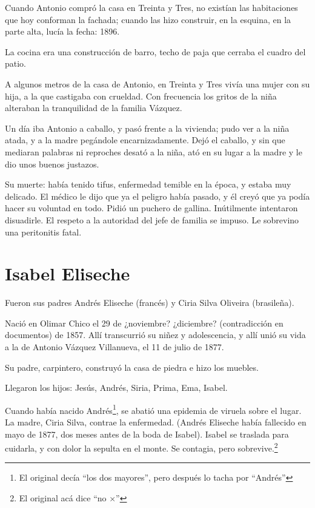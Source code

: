 \documentclass{article}
\begin{document}
\bigbreak{}

Cuando Antonio compró la casa en Treinta y Tres, no existían las habitaciones que hoy conforman la fachada; cuando las hizo construir, en la esquina, en la parte alta, lucía la fecha: 1896.

La cocina era una construcción de barro, techo de paja que cerraba el cuadro del patio.

\bigbreak{}

A algunos metros de la casa de Antonio, en Treinta y Tres vivía una mujer con su hija, a la que castigaba con crueldad. Con frecuencia los gritos de la niña alteraban la tranquilidad de la familia Vázquez.

Un día iba Antonio a caballo, y pasó frente a la vivienda; pudo ver a la niña atada, y a la madre pegándole encarnizadamente. Dejó el caballo, y sin que mediaran palabras ni reproches desató a la niña, ató en su lugar a la madre y le dio unos buenos justazos.

\bigbreak{}

Su muerte: había tenido tifus, enfermedad temible en la época, y estaba muy delicado. El médico le dijo que ya el peligro había pasado, y él creyó que ya podía hacer su voluntad en todo. Pidió un puchero de gallina. Inútilmente intentaron disuadirle. El respeto a la autoridad del jefe de familia se impuso. Le sobrevino una peritonitis fatal.

\section{Isabel Eliseche}

Fueron sus padres Andrés Eliseche (francés) y Ciria Silva Oliveira (brasileña).

Nació en Olimar Chico el 29 de ¿noviembre? ¿diciembre? (contradicción en documentos) de 1857. Allí transcurrió su niñez y adolescencia, y allí unió su vida a la de Antonio Vázquez Villanueva, el 11 de julio de 1877.

Su padre, carpintero, construyó la casa de piedra e hizo los muebles.

Llegaron los hijos: Jesús, Andrés, Siria, Prima, Ema, Isabel.

Cuando había nacido Andrés\footnote{El original decía ``los dos mayores'', pero después lo tacha por ``Andrés''}, se abatió una epidemia de viruela sobre el lugar. La madre, Ciria Silva, contrae la enfermedad. (Andrés Eliseche había fallecido en mayo de 1877, dos meses antes de la boda de Isabel). Isabel se traslada para cuidarla, y con dolor la sepulta en el monte. Se contagia, pero sobrevive.\footnote{El original acá dice ``no $\times$''}
\end{document}
